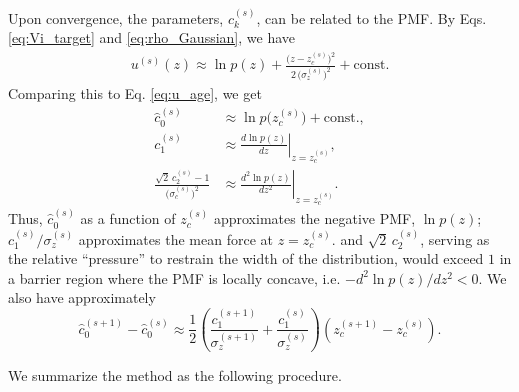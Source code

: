 \documentclass[reprint, superscriptaddress, floatfix]{revtex4-1}
\begin{document}
Upon convergence,
the parameters, $c_k^{(s)}$,
can be related to the PMF.
By Eqs. \eqref{eq:Vi_target} and \eqref{eq:rho_Gaussian}, we have
\begin{align*}
  u^{(s)}(z)
  \approx
  \ln p(z)
  +
  \frac{ \bigl(z - z_c^{(s)} \bigr)^2 }
  { 2 \, \bigl( \sigma_z^{(s)} \bigr)^2 }
  +
  \mathrm{const.}
\end{align*}
%
Comparing this to Eq. \eqref{eq:u_age}, we get
\begin{subequations}
\begin{align}
  \hat c_0^{(s)}
  &\approx \ln p\bigl(z_c^{(s)}\bigr) + \mathrm{const.}
  ,
  \\
  c_1^{(s)}
  &\approx \left. \frac{d \ln p(z) } { d z } \right|_{z = z_c^{(s)}}
  ,
  \\
  \frac{
    \sqrt 2 \, c_2^{(s)} - 1
  } { \bigl( \sigma_c^{(s)} \bigr)^2 }
  &\approx \left. \frac{d^2 \ln p(z) } { d z^2 } \right|_{z = z_c^{(s)}}
  .
\end{align}
\label{eq:ck_limit}
\end{subequations}
%
Thus,
$\hat c_0^{(s)}$ as a function of $z_c^{(s)}$
approximates the negative PMF, $\ln p(z)$;\cite{maragliano2006, *abrams2008}
$c_1^{(s)}/\sigma_z^{(s)}$
approximates the mean force at $z = z_c^{(s)}$.
%
and $\sqrt{2} \, c_2^{(s)}$,
serving as the relative ``pressure''
to restrain the width of the distribution,
would exceed $1$ in a barrier region
where the PMF is locally concave,
i.e. $-d^2\ln p(z)/dz^2 < 0$.
%
%
We also have approximately\cite{park2007, *nguyen2013, *zhang2015st}
\begin{equation}
  \hat c_0^{(s+1)} - \hat c_0^{(s)}
  \approx
  \frac{1}{2}\left(
    \frac{ c_1^{(s+1)} } { \sigma_z^{(s+1)} }
    +
    \frac{ c_1^{(s)} } { \sigma_z^{(s)} }
  \right)
  \left(
  z_c^{(s+1)} - z_c^{(s)}
  \right)
  .
  \label{eq:c0_est}
\end{equation}
%
%


We summarize the method as the following procedure.
\end{document}
